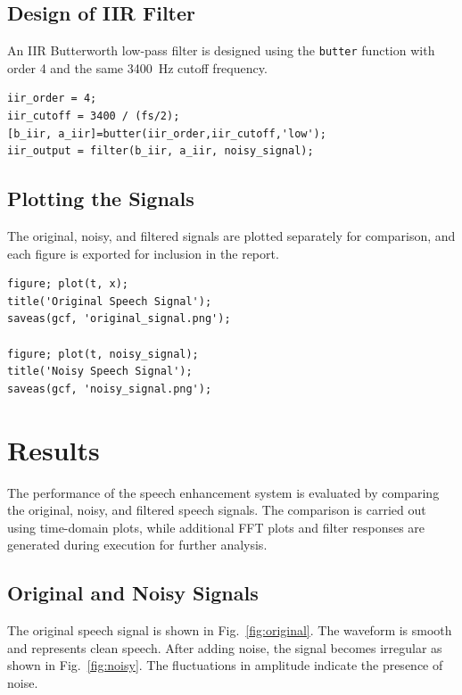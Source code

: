 \documentclass[conference]{IEEEtran}
\begin{document}
\subsection{Design of IIR Filter}

An IIR Butterworth low-pass filter is designed using the \texttt{butter} function with order 4 and the same 3400~Hz cutoff frequency.

\begin{lstlisting}[basicstyle=\footnotesize\ttfamily, breaklines=true]
iir_order = 4;
iir_cutoff = 3400 / (fs/2);
[b_iir, a_iir]=butter(iir_order,iir_cutoff,'low');
iir_output = filter(b_iir, a_iir, noisy_signal);
\end{lstlisting}

\subsection{Plotting the Signals}

The original, noisy, and filtered signals are plotted separately for comparison, and each figure is exported for inclusion in the report.

\begin{lstlisting}[basicstyle=\footnotesize\ttfamily, breaklines=true]
figure; plot(t, x);
title('Original Speech Signal');
saveas(gcf, 'original_signal.png');

figure; plot(t, noisy_signal);
title('Noisy Speech Signal');
saveas(gcf, 'noisy_signal.png');
\end{lstlisting}

\section{Results}

The performance of the speech enhancement system is evaluated by comparing the original, noisy, and filtered speech signals. The comparison is carried out using time-domain plots, while additional FFT plots and filter responses are generated during execution for further analysis.


\subsection{Original and Noisy Signals}

The original speech signal is shown in Fig.~\ref{fig:original}. The waveform is smooth and represents clean speech. After adding noise, the signal becomes irregular as shown in Fig.~\ref{fig:noisy}. The fluctuations in amplitude indicate the presence of noise.
\end{document}
